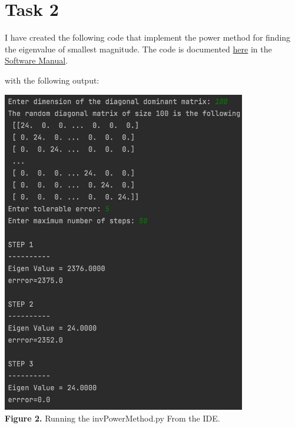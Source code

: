 \documentclass{article}
\begin{document}
\section*{Task 2}
I have created the following code that implement the power method for finding the eigenvalue of smallest magnitude. The code is documented \href{https://github.com/GoByMark/math4610/blob/main/Homework_Tasks/Tasksheet_10/src/invPowerMethod.py}{here} in the \href{https://github.com/GoByMark/math4610/blob/main/Homework_Tasks/Software_Manual/Software_Manual_toc.md}{Software Manual}.


\newpage

with the following output:
\begin{center}
\includegraphics[width=0.8\textwidth]{Screenshots/2.png}\\
{\bf Figure 2.} Running the invPowerMethod.py From the IDE.
\end{center}

\newpage
\end{document}
